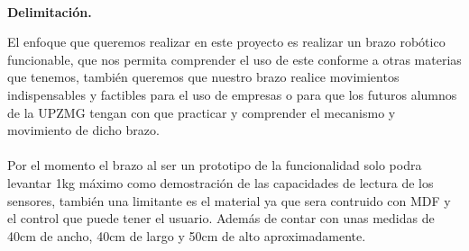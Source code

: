 \documentclass[letterpaper]{article}
\begin{document}
\vspace{1.8cm}\\
\begin{large}
    \begin{LARGE}
        \textbf{Delimitación.}\\
    \end{LARGE}
  El enfoque que queremos realizar en este proyecto es realizar un brazo robótico funcionable, que nos permita comprender el uso de este conforme a otras materias que tenemos, también queremos que nuestro brazo realice movimientos indispensables y factibles para el uso de empresas o para que los futuros alumnos de la UPZMG tengan con que practicar y comprender el mecanismo y movimiento de dicho brazo.\\\\
  Por el momento el brazo al ser un prototipo de la funcionalidad solo podra levantar 1kg máximo como demostración de las capacidades de lectura de los sensores, también una limitante es el material ya que sera contruido con MDF y el control que puede tener el usuario. Además de contar con unas medidas de 40cm de ancho, 40cm de largo y 50cm de alto aproximadamente. 
\end{large}
\end{document}
